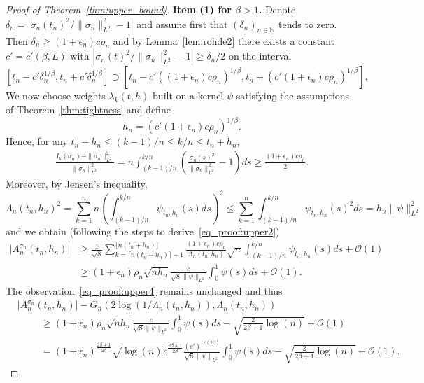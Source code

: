 \documentclass[10.5pt,letter]{article}
\numberwithin{equation}{section}
\theoremstyle{definition}
\newcommand{\N}{\mathbb{N}}
\newcommand{\1}{\mathbbm{1}}
\begin{document}
\begin{proof}[Proof of Theorem~\ref{thm:upper_bound}]
\textbf{Item (1) for $\beta> 1$.} Denote $\delta_n= |\sigma_n(t_n)^2/\|\sigma_n\|_{L^2}^2 -1|$ and assume first that $(\delta_n)_{n\in\N}$ tends to zero. Then $\delta_n\geq (1+\epsilon_n)c\rho_n$ and by Lemma~\ref{lem:rohde2} there exists a constant $c'=c'(\beta,L)$ with $|\sigma_n(t)^2/\|\sigma_n\|_{L^2}^2 -1| \geq \delta_n/2$ on the interval
\[ \left[t_n - c'\delta_n^{1/\beta}, t_n+c'\delta_n^{1/\beta}\right]\supset \left[ t_n - c' \left( (1+\epsilon_n)c\rho_n\right)^{1/\beta}, t_n + \left(c'(1+\epsilon_n)c\rho_n\right)^{1/\beta}\right]. \]
We now choose weights $\lambda_k(t,h)$ built on a kernel $\psi$ satisfying the assumptions of Theorem~\ref{thm:tightness} and define
\[ h_n = \left( c'(1+\epsilon_n)c\rho_n\right)^{1/\beta}.\]
Hence, for any $t_n-h_n\leq (k-1)/n\leq k/n\leq t_n+h_n$, 
\begin{align}\label{eq_proof:upper5}
    \frac{I_k(\sigma_n) - \|\sigma_n\|_{L^2}^2}{\|\sigma_n\|_{L^2}^2} = n\int_{(k-1)/n}^{k/n} \left(\frac{\sigma_n(s)^2}{\|\sigma_n\|_{L^2}^2} -1\right) ds \geq \frac{(1+\epsilon_n)c\rho_n}{2}.
\end{align} 
Moreover, by Jensen's inequality,
\[ \Lambda_n(t_n,h_n)^2 = \sum_{k=1}^n n\left(\int_{(k-1)/n}^{k/n} \psi_{t_n,h_n}(s)ds\right)^2 \leq \sum_{k=1}^n \int_{(k-1)/n}^{k/n} \psi_{t_n,h_n}(s)^2ds = h_n \|\psi\|_{L^2}^2\]
and we obtain (following the steps to derive~\eqref{eq_proof:upper2})
\begin{align*}
    \big| A_n^{\sigma_n}(t_n,h_n)\big| &\geq \frac{1}{\sqrt{8}}\sum_{k=\lceil n(t_n-h_n)\rceil+1}^{\lfloor n(t_n+h_n)\rfloor} \frac{(1+\epsilon_n)c\rho_n }{\Lambda_n(t_n,h_n)} \sqrt{n}\int_{(k-1)/n}^{k/n} \psi_{t_n,h_n}(s)ds + \mathcal{O}(1)\\
    &\geq (1+\epsilon_n)\rho_n \sqrt{n h_n} \frac{c}{\sqrt{8}\|\psi\|_{L^2}}\int_0^1 \psi(s)ds + \mathcal{O}(1).
\end{align*}
The observation~\eqref{eq_proof:upper4} remains unchanged and thus
\begin{align*}
    &\big|A_n^{\sigma_n}(t_n,h_n)\big|-G_n(2\log(1/\Lambda_n(t_n,h_n)),\Lambda_n(t_n,h_n))   \\
    &\hspace{1cm} \geq (1+\epsilon_n)\rho_n \sqrt{n h_n} \frac{c}{\sqrt{8}\|\psi\|_{L^2}}\int_0^1 \psi(s)ds -\sqrt{\frac{2}{2\beta+1}\log(n)}+ \mathcal{O}(1) \\
    &\hspace{1cm} = (1+\epsilon_n)^{\frac{2\beta+1}{2\beta}} \sqrt{\log(n)} c^{\frac{2\beta+1}{2\beta}} \frac{(c')^{1/(2\beta)}}{\sqrt{8}\|\psi\|_{L^2}}\int_0^1\psi(s)ds -\sqrt{\frac{2}{2\beta+1}\log(n)}+ \mathcal{O}(1).

\end{align*}
\end{proof}
\end{document}
